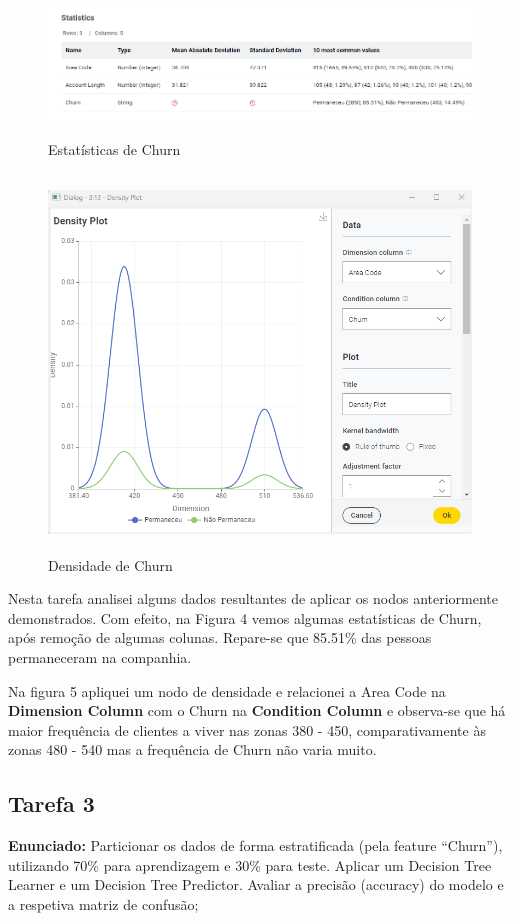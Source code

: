 \documentclass[a4paper, 12pt]{article}
\begin{document}
\begin{figure}[htp]
    
    \centering
     \includegraphics[width=\textwidth]{T2/P2-Stats.png}
     \caption{Estatísticas de Churn}

     \centering
     \includegraphics[height=10cm]{T2/P2-DensityChurn.png}
     \caption{Densidade de Churn}

\end{figure}

Nesta tarefa analisei alguns dados resultantes de aplicar os nodos anteriormente demonstrados. Com efeito, na Figura 4 vemos algumas estatísticas de Churn, após remoção de algumas colunas. Repare-se que 85.51\% das pessoas permaneceram na companhia.

Na figura 5 apliquei um nodo de densidade e relacionei a Area Code na \textbf{Dimension Column} com o Churn na \textbf{Condition Column} e observa-se que há maior frequência de clientes a viver nas zonas 380 - 450, comparativamente às zonas 480 - 540 mas a frequência de Churn não varia muito. 

\newpage

\subsection{Tarefa 3}
\textbf{Enunciado:} Particionar os dados de forma estratificada (pela feature “Churn”), utilizando 70\% para aprendizagem e 30\% para teste. Aplicar um Decision Tree Learner e um Decision Tree Predictor. Avaliar a precisão (accuracy) do modelo e a respetiva matriz de confusão;
\end{document}
